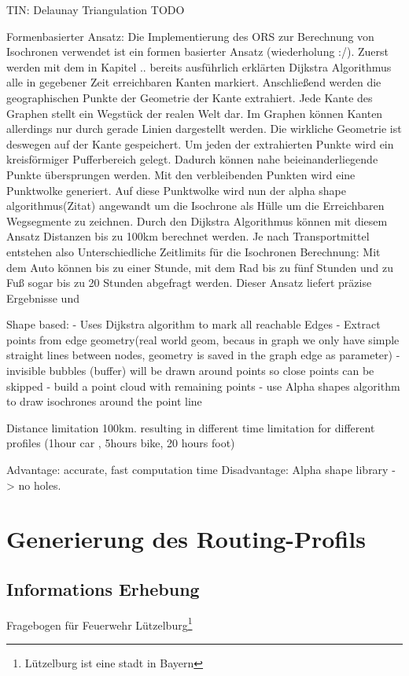 \documentclass[10pt,a4paper]{report}
\begin{document}
TIN: Delaunay Triangulation
TODO


Formenbasierter Ansatz:
Die Implementierung des ORS zur Berechnung von Isochronen verwendet ist ein formen basierter Ansatz (wiederholung :/). Zuerst werden mit dem in Kapitel .. bereits ausführlich erklärten Dijkstra Algorithmus alle in gegebener Zeit erreichbaren Kanten markiert. Anschließend werden die geographischen Punkte der Geometrie der Kante extrahiert. Jede Kante des Graphen stellt ein Wegstück der realen Welt dar. Im Graphen können Kanten allerdings nur durch gerade Linien dargestellt werden. Die wirkliche Geometrie ist deswegen auf der Kante gespeichert. Um jeden der extrahierten Punkte wird ein kreisförmiger Pufferbereich gelegt. Dadurch können nahe beieinanderliegende Punkte übersprungen werden. Mit den verbleibenden Punkten wird eine Punktwolke generiert. Auf diese Punktwolke wird nun der alpha shape algorithmus(Zitat) angewandt um die Isochrone als Hülle um die Erreichbaren Wegsegmente zu zeichnen.
Durch den Dijkstra Algorithmus können mit diesem Ansatz Distanzen bis zu 100km berechnet werden. Je nach Transportmittel entstehen also Unterschiedliche Zeitlimits für die Isochronen Berechnung: Mit dem Auto können bis zu einer Stunde, mit dem Rad bis zu fünf Stunden und zu Fuß sogar bis zu 20 Stunden abgefragt werden. Dieser Ansatz liefert präzise Ergebnisse und 

Shape based:
- Uses Dijkstra algorithm to mark all reachable Edges
- Extract points from edge geometry(real world geom, becaus in graph we only have simple straight lines between nodes, geometry is saved in the graph edge as parameter)
- invisible bubbles (buffer) will be drawn around points so close points can be skipped
- build a point cloud with remaining points
- use Alpha shapes algorithm to draw isochrones around the point line

 Distance limitation 100km. resulting in different time limitation for different profiles (1hour car , 5hours bike, 20 hours foot)

Advantage: accurate, fast computation time
Disadvantage: Alpha shape library -> no holes.



\section{Generierung des Routing-Profils}

\subsection{Informations Erhebung}
Fragebogen für Feuerwehr Lützelburg\footnote{Lützelburg ist eine stadt in Bayern}
\end{document}

